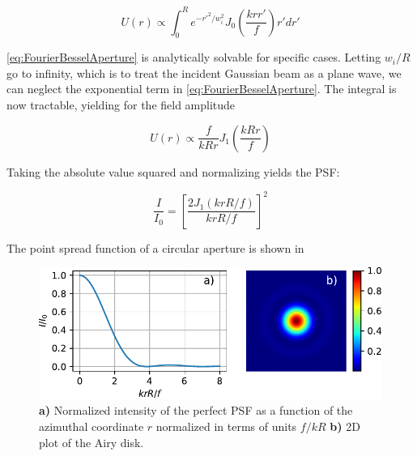 \begin{equation}\label{eq:FourierBesselAperture}
    U(r) \propto \int_0^R e^{-r'^2/w_i^2} J_0\left(\frac{k r r'}{f}\right)r'dr'
\end{equation}

\cref{eq:FourierBesselAperture} is analytically solvable for specific cases. Letting $w_i/R$ go to infinity, which is to treat the incident Gaussian beam as a plane wave, we can neglect the exponential term in \cref{eq:FourierBesselAperture}. The integral is now tractable, yielding for the field amplitude

\begin{equation}\label{eq:AiryField}
    U(r) \propto \frac{f}{kRr} J_1\left(\frac{k R r}{f}\right)
\end{equation}

Taking the absolute value squared and normalizing yields the \ac{PSF}:

\begin{equation}
    \frac{I}{I_0} = \left[
    \frac{2J_1(k r R/f)}{k r R/f}
    \right]^2
\end{equation}

The point spread function of a circular aperture is shown in 


\begin{figure}
    \centering
    \includegraphics[width = 0.8\linewidth]{figures/AiryDisk.pdf}
    \caption{\textbf{a)} Normalized intensity of the perfect \ac{PSF} as a function of the azimuthal coordinate $r$ normalized in terms of units $f / kR$ \textbf{b) }2D plot of the Airy disk.  }
    \label{fig:AiryPlots}
\end{figure}










